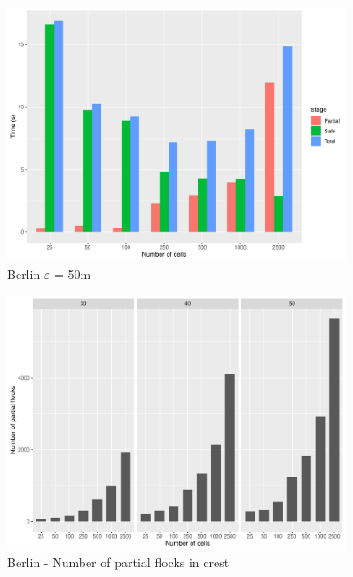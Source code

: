 \documentclass[a4paper,10pt]{article}
\begin{document}
\begin{figure}[h!]
 \centering
 \includegraphics[width=0.9\textwidth]{berlinE50_partitions.pdf}
 \caption{Berlin $\varepsilon$ = 50m}
 \label{fig:berlin50}
\end{figure}

\begin{figure}[h!]
 \centering
 \includegraphics[width=0.9\textwidth]{berlin_npartials.pdf}
 \caption{Berlin - Number of partial flocks in crest}
 \label{fig:berlin_npartials}
\end{figure}
\end{document}
